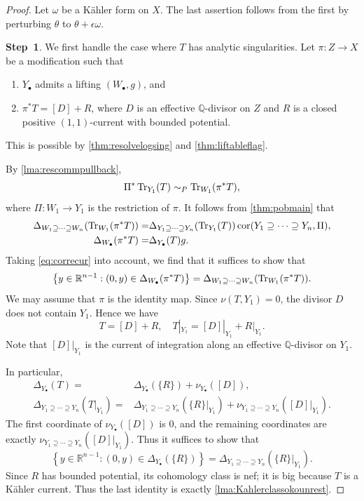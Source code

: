 \begin{proof}
    Let $\omega$ be a K\"ahler form on $X$. The last assertion follows from the first by perturbing $\theta$ to $\theta+\epsilon\omega$.

    \textbf{Step~1}.
    We first handle the case where $T$ has analytic singularities. Let $\pi\colon Z\rightarrow X$ be a modification such that
    \begin{enumerate}
        \item\label{itm:chapter-Okounkov:L1728:1} $Y_{\bullet}$ admits a lifting $(W_{\bullet},g)$, and
        \item\label{itm:chapter-Okounkov:L1728:2} $\pi^*T=[D]+R$, where $D$ is an effective $\mathbb{Q}$-divisor on $Z$ and $R$ is a closed positive $(1,1)$-current with bounded potential.
    \end{enumerate}
    This is possible by \cref{thm:resolvelogsing} and \cref{thm:liftableflag}.

    By \cref{lma:rescommpullback},
    \[
    \Pi^*\operatorname{Tr}_{Y_1}(T)\sim_P \operatorname{Tr}_{W_1}(\pi^*T),
    \]
    where $\Pi\colon W_1\rightarrow Y_1$ is the restriction of $\pi$. It follows from \cref{thm:pobmain} that
    \[
    \begin{split}
    \Delta_{W_1\supseteq \cdots \supseteq W_n}(\operatorname{Tr}_{W_1}(\pi^*T))=& \Delta_{Y_1\supseteq \cdots \supseteq Y_n}(\operatorname{Tr}_{Y_1}(T))\operatorname{cor}(Y_1\supseteq \cdots \supseteq Y_n,\Pi),\\
    \Delta_{W_{\bullet}}(\pi^*T)=&\Delta_{Y_{\bullet}}(T)g.
    \end{split}
    \]
    Taking \eqref{eq:correcur} into account, we find that it suffices to show that
    \[
    \left\{y\in \mathbb{R}^{n-1}:(0,y)\in\Delta_{W_{\bullet}}(\pi^*T) \right\}=\Delta_{W_1\supseteq \cdots \supseteq W_n}(\operatorname{Tr}_{W_1}(\pi^*T)).
    \]
    We may assume that $\pi$ is the identity map. Since $\nu(T,Y_1)=0$, the divisor $D$ does not contain $Y_1$. Hence we have
    \[
    T=[D]+R,\quad T|_{Y_1}=[D]|_{Y_1}+R|_{Y_1}.
    \]
    Note that $[D]|_{Y_1}$ is the current of integration along an effective $\mathbb{Q}$-divisor on $Y_1$.

    In particular,
    \[
    \begin{split}
    \Delta_{Y_{\bullet}}(T)=& \Delta_{Y_{\bullet}}(\{R\})+\nu_{Y_{\bullet}}([D]),\\
    \Delta_{Y_1\supseteq \cdots \supseteq Y_n}(T|_{Y_1})=& \Delta_{Y_1\supseteq \cdots \supseteq Y_n}(\{R\}|_{Y_1})+\nu_{Y_1\supseteq \cdots \supseteq Y_n}([D]|_{Y_1}).
    \end{split}
    \]
    The first coordinate of $\nu_{Y_{\bullet}}([D])$ is $0$, and the remaining coordinates are exactly $\nu_{Y_1\supseteq \cdots \supseteq Y_n}([D]|_{Y_1})$. Thus it suffices to show that
    \[
    \left\{y\in \mathbb{R}^{n-1}: (0,y)\in \Delta_{Y_{\bullet}}(\{R\})\right\}=\Delta_{Y_1\supseteq \cdots \supseteq Y_n}(\{R\}|_{Y_1}).
    \]
    Since $R$ has bounded potential, its cohomology class is nef; it is big because $T$ is a Kähler current. Thus the last identity is exactly \cref{lma:Kahlerclassokounrest}.


\end{proof}
